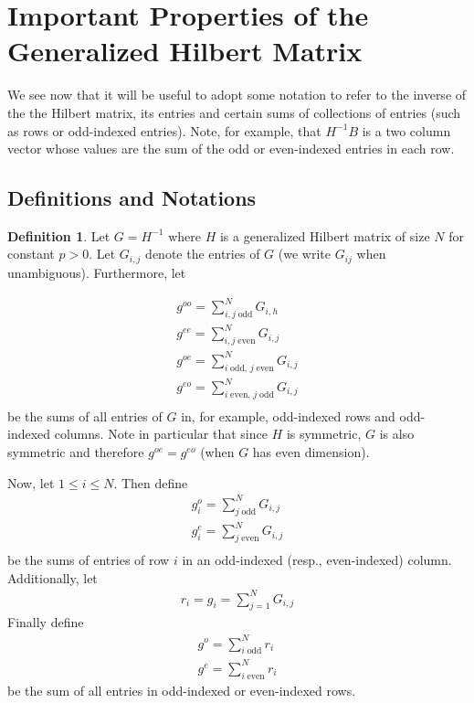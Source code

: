 \documentclass{article}
\theoremstyle{definition}
\newtheorem{defn}[thm]{Definition}
\theoremstyle{remark}
\numberwithin{equation}{section}
\begin{document}
\section{Important Properties of the Generalized Hilbert Matrix}
\label{hilbert-matrices}
We see now that it will be useful to adopt some notation to refer to the inverse of the the Hilbert matrix, its entries and certain sums of collections of entries (such as rows or odd-indexed entries). Note, for example, that $H^{-1}B$ is a two column vector whose values are the sum of the odd or even-indexed entries in each row. 
\subsection{Definitions and Notations}
\begin{defn}
Let $G=H^{-1}$ where $H$ is a generalized Hilbert matrix of size $N$ for constant $p > 0$. Let $G_{i,j}$ denote the entries of $G$ (we write $G_{ij}$ when unambiguous). Furthermore, let 

\begin{align*} 
g^{oo} = \sum_{i,j \; \text{odd}}^N G_{i,h} \\
g^{ee} = \sum_{i,j \; \text{even}}^N  G_{i,j} \\
g^{oe} = \sum_{i \; \text{odd, } j \; \text{even}}^N  G_{i,j} \\
g^{eo} = \sum_{i \; \text{even, } j \; \text{odd}}^N  G_{i,j} \\
\end{align*} be the sums of all entries of $G$ in, for example, odd-indexed rows and odd-indexed columns. Note in particular that since $H$ is symmetric, $G$ is also symmetric and therefore $g^{oe} = g^{eo}$ (when $G$ has even dimension). 

Now, let $1 \le i \le N$. Then define 
\begin{align*}
g_i^o= \sum_{j \; \text{odd}}^N G_{i, j} \\
g_i^e= \sum_{j \; \text{even}}^N G_{i, j} \\
\end{align*} be the sums of entries of row $i$ in an odd-indexed (resp., even-indexed) column. Additionally, let 
\begin{align*}
r_i=g_i = \sum_{j=1}^N G_{i,j}
\end{align*}
Finally define 
\begin{align*}
g^o = \sum_{i \; \text{odd}}^N r_i\\
g^e = \sum_{i \; \text{even}}^N r_i
\end{align*} be the sum of all entries in odd-indexed or even-indexed rows.
\end{defn} 
\end{document}
